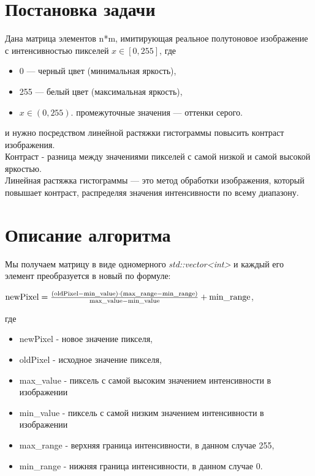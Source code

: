 \documentclass[a4paper,12pt]{article}
\begin{document}
\section{Постановка задачи}
Дана матрица элементов n*m, имитирующая реальное полутоновое изображение с интенсивностью пикселей 
\( x \in [0, 255] \), где
\begin{itemize}
  \item 0 — черный цвет (минимальная яркость),
  \item 255 — белый цвет (максимальная яркость),
  \item \( x \in (0, 255) \). промежуточные значения — оттенки серого.
\end{itemize}
и нужно посредством линейной растяжки гистограммы повысить контраст изображения.\\[0.1cm]
Контраст - разница между значениями пикселей с самой низкой и самой высокой яркостью.\\ [0.1cm]
Линейная растяжка гистограммы — это метод обработки изображения, который повышает контраст, распределяя значения интенсивности по всему диапазону.
\newpage


\section{Описание алгоритма}
Мы получаем матрицу в виде одномерного \textit{std::vector<int>} и каждый его элемент преобразуется в новый по формуле:
\begin{center} 
{\Large 
$
\text{\normalsize newPixel} = \frac{(\text{oldPixel} - \text{min\_value}) \cdot 
(\text{max\_range} - \text{min\_range})}{\text{max\_value} - \text{min\_value}} + \text{\normalsize min\_range}
$, 
}
\end{center}
где \begin{itemize}
  \item newPixel - новое значение пикселя,
  \item oldPixel - исходное значение пикселя,
  \item max\_value - пиксель с самой высоким значением интенсивности в изображении
  \item min\_value - пиксель с самой низким значением интенсивности в изображении
  \item max\_range - верхняя граница интенсивности, в данном случае 255,
  \item min\_range - нижняя граница интенсивности, в данном случае 0.
\end{itemize}
\newpage
\end{document}
